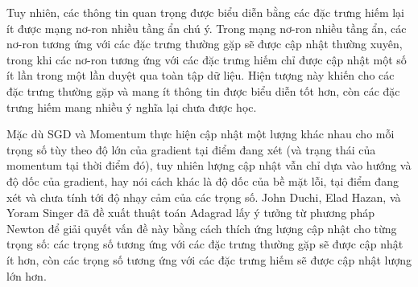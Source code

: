 Tuy nhiên, các thông tin quan trọng được biểu diễn bằng các đặc trưng hiếm lại ít được mạng nơ-ron nhiều tầng ẩn chú ý. Trong mạng nơ-ron nhiều tầng ẩn, các nơ-ron tương ứng với các đặc trưng thường gặp sẽ được cập nhật thường xuyên, trong khi các nơ-ron tương ứng với các đặc trưng hiếm chỉ được cập nhật một số ít lần trong một lần duyệt qua toàn tập dữ liệu. Hiện tượng này khiến cho các đặc trưng thường gặp và mang ít thông tin được biểu diễn tốt hơn, còn các đặc trưng hiếm mang nhiều ý nghĩa lại chưa được học.

Mặc dù SGD và Momentum thực hiện cập nhật một lượng khác nhau cho mỗi trọng số tùy theo độ lớn của gradient tại điểm đang xét (và trạng thái của momentum tại thời điểm đó), tuy nhiên lượng cập nhật vẫn chỉ dựa vào hướng và độ dốc của gradient, hay nói cách khác là độ dốc của bề mặt lỗi, tại điểm đang xét và chưa tính tới độ nhạy cảm của các trọng số. John Duchi, Elad Hazan, và Yoram Singer đã đề xuất thuật toán Adagrad\cite{duchi2011adaptive} lấy ý tưởng từ phương pháp Newton để giải quyết vấn đề này bằng cách thích ứng lượng cập nhật cho từng trọng số: các trọng số tương ứng với các đặc trưng thường gặp sẽ được cập nhật ít hơn, còn các trọng số tương ứng với các đặc trưng hiếm sẽ được cập nhật lượng lớn hơn.

